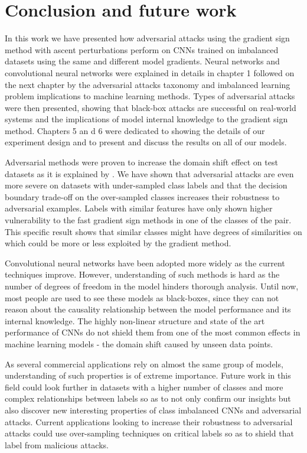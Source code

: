 \chapter{Conclusion and future work} \label{chap:conclusion}
In this work we have presented how adversarial attacks using the gradient sign method with ascent perturbations perform on CNNs trained on imbalanced datasets using the same and different model gradients. Neural networks and convolutional neural networks were explained in details in chapter 1 followed on the next chapter by the adversarial attacks taxonomy and imbalanced learning problem implications to machine learning methods. Types of adversarial attacks were then presented, showing that black-box attacks are successful on real-world systems and the implications of model internal knowledge to the gradient sign method. Chapters 5 an d 6 were dedicated to showing the details of our experiment design and to present and discuss the results on all of our models.

Adversarial methods were proven to increase the domain shift effect on test datasets as it is explained by \cite{papernot2016transf}. We have shown that adversarial attacks are even more severe on datasets with under-sampled class labels and that the decision boundary trade-off on the over-sampled classes increases their robustness to adversarial examples. Labels with similar features have only shown higher vulnerability to the fast gradient sign methods in one of the classes of the pair. This specific result shows that similar classes might have degrees of similarities on which could be more or less exploited by the gradient method.  

Convolutional neural networks have been adopted more widely as the current techniques improve. However, understanding of such methods is hard as the number of degrees of freedom in the model hinders thorough analysis. Until now, most people  are used to see these models as black-boxes, since they can not reason about the causality relationship between the model performance and its internal knowledge. The highly non-linear structure and state of the art performance of CNNs do not shield them from one of the most common effects in machine learning models - the domain shift caused by unseen data points.

As several commercial applications rely on almost the same group of models, understanding of such properties is of extreme importance. Future work in this field could look further in datasets with a higher number of classes and more complex relationships between labels so as to not only confirm our insights but also discover new interesting properties of class imbalanced CNNs and adversarial attacks. Current applications looking to increase their robustness to adversarial attacks could use over-sampling techniques on critical labels so as to shield that label from malicious attacks.

